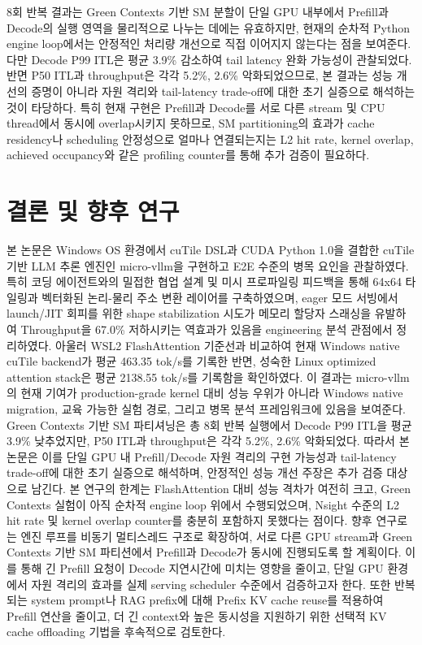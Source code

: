 \documentclass{kcc} %
\begin{document}
8회 반복 결과는 Green Contexts 기반 SM 분할이 단일 GPU 내부에서 Prefill과 Decode의 실행 영역을 물리적으로 나누는 데에는 유효하지만, 현재의 순차적 Python engine loop에서는 안정적인 처리량 개선으로 직접 이어지지 않는다는 점을 보여준다. 다만 Decode P99 ITL은 평균 3.9\% 감소하여 tail latency 완화 가능성이 관찰되었다. 반면 P50 ITL과 throughput은 각각 5.2\%, 2.6\% 악화되었으므로, 본 결과는 성능 개선의 증명이 아니라 자원 격리와 tail-latency trade-off에 대한 초기 실증으로 해석하는 것이 타당하다. 특히 현재 구현은 Prefill과 Decode를 서로 다른 stream 및 CPU thread에서 동시에 overlap시키지 못하므로, SM partitioning의 효과가 cache residency나 scheduling 안정성으로 얼마나 연결되는지는 L2 hit rate, kernel overlap, achieved occupancy와 같은 profiling counter를 통해 추가 검증이 필요하다.


\section{결론 및 향후 연구}

본 논문은 Windows OS 환경에서 cuTile DSL과 CUDA Python 1.0을 결합한 cuTile 기반 LLM 추론 엔진인 micro-vllm을 구현하고 E2E 수준의 병목 요인을 관찰하였다. 특히 코딩 에이전트와의 밀접한 협업 설계 및 미시 프로파일링 피드백을 통해 64x64 타일링과 벡터화된 논리-물리 주소 변환 레이어를 구축하였으며, eager 모드 서빙에서 launch/JIT 회피를 위한 shape stabilization 시도가 메모리 할당자 스래싱을 유발하여 Throughput을 67.0\% 저하시키는 역효과가 있음을 engineering 분석 관점에서 정리하였다. 아울러 WSL2 FlashAttention 기준선과 비교하여 현재 Windows native cuTile backend가 평균 463.35 tok/s를 기록한 반면, 성숙한 Linux optimized attention stack은 평균 2138.55 tok/s를 기록함을 확인하였다. 이 결과는 micro-vllm의 현재 기여가 production-grade kernel 대비 성능 우위가 아니라 Windows native migration, 교육 가능한 실험 경로, 그리고 병목 분석 프레임워크에 있음을 보여준다. Green Contexts 기반 SM 파티셔닝은 총 8회 반복 실행에서 Decode P99 ITL을 평균 3.9\% 낮추었지만, P50 ITL과 throughput은 각각 5.2\%, 2.6\% 악화되었다. 따라서 본 논문은 이를 단일 GPU 내 Prefill/Decode 자원 격리의 구현 가능성과 tail-latency trade-off에 대한 초기 실증으로 해석하며, 안정적인 성능 개선 주장은 추가 검증 대상으로 남긴다. 본 연구의 한계는 FlashAttention 대비 성능 격차가 여전히 크고, Green Contexts 실험이 아직 순차적 engine loop 위에서 수행되었으며, Nsight 수준의 L2 hit rate 및 kernel overlap counter를 충분히 포함하지 못했다는 점이다. 향후 연구로는 엔진 루프를 비동기 멀티스레드 구조로 확장하여, 서로 다른 GPU stream과 Green Contexts 기반 SM 파티션에서 Prefill과 Decode가 동시에 진행되도록 할 계획이다. 이를 통해 긴 Prefill 요청이 Decode 지연시간에 미치는 영향을 줄이고, 단일 GPU 환경에서 자원 격리의 효과를 실제 serving scheduler 수준에서 검증하고자 한다. 또한 반복되는 system prompt나 RAG prefix에 대해 Prefix KV cache reuse를 적용하여 Prefill 연산을 줄이고, 더 긴 context와 높은 동시성을 지원하기 위한 선택적 KV cache offloading 기법을 후속적으로 검토한다.
\end{document}
